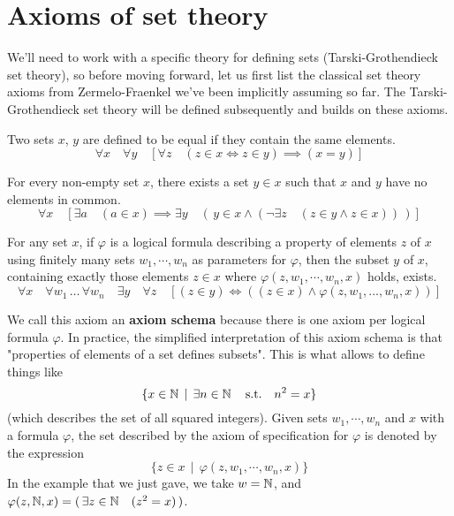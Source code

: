 \section{Axioms of set theory}

We'll need to work with a specific theory for defining sets (Tarski-Grothendieck set theory), so before moving forward, let us first list the classical set theory axioms from Zermelo-Fraenkel we've been implicitly assuming so far. The Tarski-Grothendieck set theory will be defined subsequently and builds on these axioms.
\\

\begin{axiom} \label{axiom-of-extensionality}
    Two sets $x$, $y$ are defined to be equal if they contain the same elements. 
    \[
        \forall x \quad \forall y \quad [ \forall z \quad ( z \in x \Leftrightarrow z \in y) \implies (x = y)]
    \]
\end{axiom}

\begin{axiom} \label{axiom-of-regularity}
    For every non-empty set $x$, there exists a set $y \in x$ such that $x$ and $y$ have no elements in common.
    \[
        \forall x \quad [ \exists a \quad (a\in x) \implies \exists y \quad ( \, y \in x \land (\lnot \exists z \quad (z \in y \land z \in x)) \, ) ]
    \]
\end{axiom}

\begin{axiom} \label{axiom-schema-of-specification}
    For any set $x$, if $\varphi$ is a logical formula describing a property of elements $z$ of $x$ using finitely many sets $w_1, \cdots, w_n$ as parameters for $\varphi$, then the subset $y$ of $x$, containing exactly those elements $z \in x$ where $\varphi(z,w_1,\cdots,w_n,x)$ holds, exists. 
    \[
        \forall x \quad \forall w_1 \, \ldots \, \forall w_n \quad \exists y \quad \forall z \quad [ (z \in y) \iff ( (z \in x) \land \varphi(z,w_1,...,w_n,x)) ]    
    \]
\end{axiom}

\begin{remark}
    We call this axiom an \textbf{axiom schema} because there is one axiom per logical formula $\varphi$. In practice, the simplified interpretation of this axiom schema is that "properties of elements of a set defines subsets". This is what allows to define things like
    \[
        \{ x \in \operatorname{\mathbb N} \, \mid \, \exists n \in \operatorname{\mathbb N} \quad \text{s.t.} \quad n^2 = x \}
    \]
    (which describes the set of all squared integers). Given sets $w_1,\cdots,w_n$ and $x$ with a formula $\varphi$, the set described by the axiom of specification for $\varphi$ is denoted by the expression
    \[
        \{ z \in x \, \mid \, \varphi(z,w_1,\cdots,w_n,x) \}    
    \]
    In the example that we just gave, we take $w = \operatorname{\mathbb N}$, and $\varphi(z,\operatorname{\mathbb N},x) = ( \, \exists z \in \operatorname{\mathbb N} \quad (z^2 = x) \, )$. 
\end{remark}

